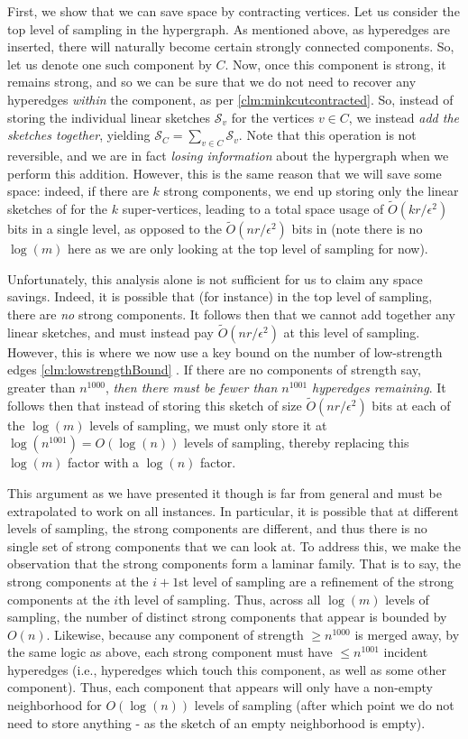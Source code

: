 \documentclass[11pt]{article}
\theoremstyle{definition}
\newcommand{\eps}{\epsilon}
\begin{document}
First, we show that we can save space by contracting vertices. Let us consider the top level of sampling in the hypergraph. As mentioned above, as hyperedges are inserted, there will naturally become certain strongly connected components.
So, let us denote one such component by $C$. Now, once this component is strong, it remains strong, and so we can be sure that we do not need to recover any hyperedges \emph{within} the component, as per \cref{clm:minkcutcontracted}. So, instead of storing the individual linear sketches $\mathcal{S}_v$ for the vertices $v \in C$, we instead \emph{add the sketches together}, yielding $\mathcal{S}_C = \sum_{v \in C} \mathcal{S}_v$. Note that this operation is not reversible, and we are in fact \emph{losing information} about the hypergraph when we perform this addition. However, this is the same reason that we will save some space: indeed, if there are $k$ strong components, we end up storing only the linear sketches of \cite{KPS24d} for the $k$ super-vertices, leading to a total space usage of $\widetilde{O}(k r / \eps^2)$ bits in a single level, as opposed to the $\widetilde{O}(n r / \eps^2)$ bits in \cite{KPS24d} (note there is no $\log(m)$ here as we are only looking at the top level of sampling for now). 

Unfortunately, this analysis alone is not sufficient for us to claim any space savings. Indeed, it is possible that (for instance) in the top level of sampling, there are \emph{no} strong components. It follows then that we cannot add together any linear sketches, and must instead pay $\widetilde{O}(n r / \eps^2)$ at this level of sampling. However, this is where we now use a key bound on the number of low-strength edges \cref{clm:lowstrengthBound} \cite{Qua23}. If there are no components of strength say, greater than $n^{1000}$, \emph{then there must be fewer than $n^{1001}$ hyperedges remaining}. It follows then that instead of storing this sketch of size $\widetilde{O}(n r / \eps^2)$ bits at each of the $\log(m)$ levels of sampling, we must only store it at $\log(n^{1001}) = O(\log(n))$ levels of sampling, thereby replacing this $\log(m)$ factor with a $\log(n)$ factor.

This argument as we have presented it though is far from general and must be extrapolated to work on all instances. In particular,  it is possible that at different levels of sampling, the strong components are different, and thus there is no single set of strong components that we can look at. To address this, we make the observation that the strong components form a laminar family. That is to say, the strong components at the $i+1$st level of sampling are a refinement of the strong components at the $i$th level of sampling. Thus, across all $\log(m)$ levels of sampling, the number of distinct strong components that appear is bounded by $O(n)$. Likewise, because any component of strength $\geq n^{1000}$ is merged away, by the same logic as above, each strong component must have $\leq n^{1001}$ incident hyperedges (i.e., hyperedges which touch this component, as well as some other component). Thus, each component that appears will only have a non-empty neighborhood for $O(\log(n))$ levels of sampling (after which point we do not need to store anything - as the sketch of an empty neighborhood is empty). 
\end{document}
